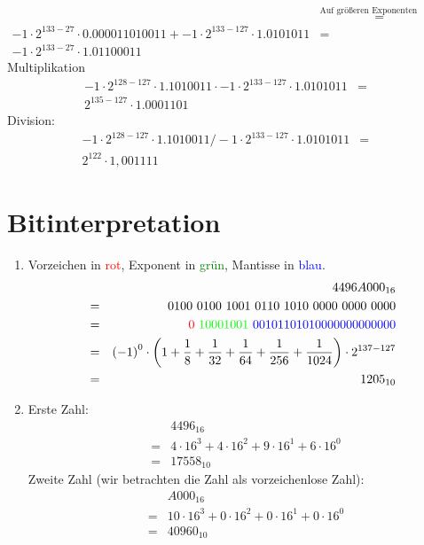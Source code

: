 \documentclass[DIN, pagenumber=false, fontsize=11pt, parskip=half]{scrartcl}
\begin{document}
\begin{enumerate}[label=(\alph*)]
\begin{eqnarray*}
                &\stackrel{\text{Auf größeren Exponenten normalisieren}}{=}&\\
                -1 \cdot 2^{133-27} \cdot 0.000011010011 + -1 \cdot 2^{133-127} \cdot 1.0101011 &=&\\
                -1 \cdot 2^{133-27} \cdot 1.01100011
            \end{eqnarray*}
            Multiplikation
            \begin{eqnarray*}
                -1 \cdot 2^{128-127} \cdot 1.1010011 \cdot -1 \cdot 2^{133-127} \cdot 1.0101011 &=&\\
                2^{135-127} \cdot 1.0001101
            \end{eqnarray*}
            Division:
            \begin{eqnarray*}
                -1 \cdot 2^{128-127} \cdot 1.1010011 / -1 \cdot 2^{133-127} \cdot 1.0101011 &=&\\
                2^{122} \cdot 1,001111
            \end{eqnarray*}
    \end{enumerate}
    \section{Bitinterpretation}
    \begin{enumerate}[label=(\alph*)]
        \item Vorzeichen in \textcolor{red}{rot}, Exponent in \textcolor{green}{grün}, Mantisse in \textcolor{blue}{blau}.
            \begin{eqnarray*}
                &&{4496A000}_{16} \\&=&
                0100\ 0100\ 1001\ 0110\ 1010\ 0000\ 0000\ 0000 \\&=& 
                \textcolor{red}{0}\ \textcolor{green}{10001001}\ \textcolor{blue}{00101101010000000000000} \\&=&
                {(-1)}^0 \cdot \left(1+\frac{1}{8}+\frac{1}{32}+\frac{1}{64}+\frac{1}{256}+\frac{1}{1024}\right) \cdot 2^{137-127} \\&=&
                {1205}_{10}
            \end{eqnarray*}
        \item
            Erste Zahl:
            \begin{eqnarray*}
                &&{4496}_{16} \\&=&
                4 \cdot 16^3 + 4 \cdot 16^2 + 9 \cdot 16^1 + 6 \cdot 16^0 \\&=&
                {17558}_{10}
            \end{eqnarray*}
            Zweite Zahl (wir betrachten die Zahl als vorzeichenlose Zahl):
            \begin{eqnarray*}
                &&{A000}_{16} \\&=&
                10 \cdot 16^3 + 0 \cdot 16^2 + 0 \cdot 16^1 + 0 \cdot 16^0 \\&=&
                {40960}_{10}
            \end{eqnarray*}
    \end{enumerate}
\end{document}
